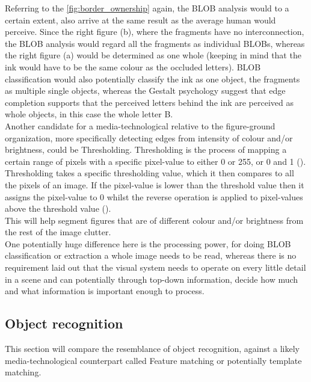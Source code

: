 \documentclass{article}
\newcommand{\goodcite}[1]{ {(\cite{#1})}}
\begin{document}
Referring to the \autoref{fig:border_ownership} again, the BLOB analysis would to a certain extent, also arrive at the same result as the average human would perceive. Since the right figure (b), where the fragments have no interconnection, the BLOB analysis would regard all the fragments as individual BLOBs, whereas the right figure (a) would be determined as one whole (keeping in mind that the ink would have to be the same colour as the occluded letters). BLOB classification would also potentially classify the ink as one object, the fragments as multiple single objects, whereas the Gestalt psychology suggest that edge completion supports that the perceived letters behind the ink are perceived as whole objects, in this case the whole letter B.\medskip\\

Another candidate for a media-technological relative to the figure-ground organization, more specifically detecting edges from intensity of colour and/or brightness, could be Thresholding. Thresholding is the process of mapping a certain range of pixels with a specific pixel-value to either 0 or 255, or 0 and 1\goodcite{IP}. Thresholding takes a specific thresholding value, which it then compares to all the pixels of an image. If the pixel-value is lower than the threshold value then it assigns the pixel-value to 0 whilst the reverse operation is applied to pixel-values above the threshold value\goodcite{IP}.\\This will help segment figures that are of different colour and/or brightness from the rest of the image clutter.\medskip \\

One potentially huge difference here is the processing power, for doing BLOB classification or extraction a whole image needs to be read, whereas there is no requirement laid out that the visual system needs to operate on every little detail in a scene and can potentially through top-down information, decide how much and what information is important enough to process.


\subsection{Object recognition}
This section will compare the resemblance of object recognition, against a likely media-technological counterpart called Feature matching or potentially template matching.
\end{document}
